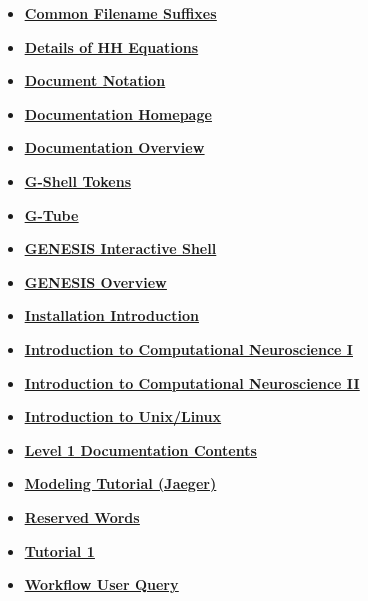 \documentclass[12pt]{article}
\begin{document}
\begin{itemize}
\item \href{../common-suffixes/common-suffixes.pdf}{\bf \underline{Common Filename Suffixes}}

\item \href{../hh-model-details/hh-model-details.pdf}{\bf \underline{Details of HH Equations}}

\item \href{../document-notation/document-notation.pdf}{\bf \underline{Document Notation}}

\item \href{../documentation-homepage/documentation-homepage.pdf}{\bf \underline{Documentation Homepage}}

\item \href{../documentation-overview/documentation-overview.pdf}{\bf \underline{Documentation Overview}}

\item \href{../shell-tokens/shell-tokens.pdf}{\bf \underline{G-Shell Tokens}}

\item \href{../gtube/gtube.pdf}{\bf \underline{G-Tube}}

\item \href{../gshell/gshell.pdf}{\bf \underline{GENESIS Interactive Shell}}

\item \href{../genesis-overview/genesis-overview.pdf}{\bf \underline{GENESIS Overview}}

\item \href{../installation-introduction/installation-introduction.pdf}{\bf \underline{Installation Introduction}}

\item \href{../compneurosci-1/compneurosci-1.pdf}{\bf \underline{Introduction to Computational Neuroscience I}}

\item \href{../compneurosci-2/compneurosci-2.pdf}{\bf \underline{Introduction to Computational Neuroscience II}}

\item \href{../unix-linux/unix-linux.pdf}{\bf \underline{Introduction to Unix/Linux}}

\item \href{../contents-level1/contents-level1.pdf}{\bf \underline{Level 1 Documentation Contents}}

\item \href{../tutorial-jaeger/tutorial-jaeger.pdf}{\bf \underline{Modeling Tutorial (Jaeger)}}

\item \href{../reserved-words/reserved-words.pdf}{\bf \underline{Reserved Words}}

\item \href{../tutorial1/tutorial1.pdf}{\bf \underline{Tutorial 1}}

\item \href{../workflow-user-query/workflow-user-query.pdf}{\bf \underline{Workflow User Query}}


\end{itemize}

\end{document}
